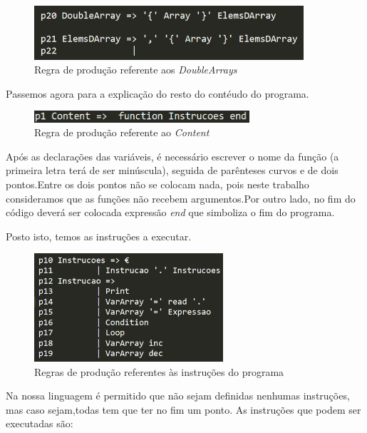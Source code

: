 \documentclass[11pt,a4paper]{report}
\begin{document}
\vspace{0.01ex}
\begin{figure}[hbt!]
	\centering
	\hspace*{-1cm}
	\includegraphics[width=100mm,scale=1]{images/double_Array}
	\caption{Regra de produção referente aos \textit{DoubleArrays}}
\end{figure}
\vspace{3ex}
Passemos agora para a explicação do resto do contéudo do programa.

\vspace{1ex}
\begin{figure}[hbt!]
	\centering
	\hspace*{-1cm}
	\includegraphics[width=80mm,scale=1]{images/content}
	\caption{Regra de produção referente ao \textit{Content}}
\end{figure}

\vspace{1ex}
Após as declarações das variáveis, é necessário escrever o nome da função (a primeira letra terá de ser minúscula), seguida de parênteses curvos e de dois pontos.Entre os dois pontos não se colocam nada, pois neste trabalho consideramos que as funções não recebem argumentos.Por outro lado, no fim do código deverá ser colocada expressão \textit{end} que simboliza o fim do programa.\par 
Posto isto, temos as instruções a executar.\par
\begin{figure}[hbt!]
	\centering
	\includegraphics[width=70mm,scale = 1]{images/instrucoes}
	\caption{Regras de produção referentes às instruções do programa}
	\label{fig:instruções}
\end{figure}

 Na nossa linguagem é permitido que não sejam definidas nenhumas instruções, mas caso sejam,todas tem que ter no fim um ponto.
 As instruções que podem ser executadas são:
 
\end{document}
